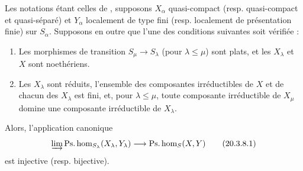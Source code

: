 \begin{proposition}[20.3.8]
\label{IV.20.3.8}
Les notations étant celles de , supposons $X_\alpha$ quasi-compact (resp. quasi-compact et quasi-séparé) et $Y_\alpha$ localement de type fini (resp. localement de présentation finie) sur $S_\alpha$.
Supposons en outre que l'une des conditions suivantes soit vérifiée :
\begin{enumerate}[label=\emph{(\roman*)}]
  \item Les morphismes de transition $S_\mu\to S_\lambda$ (pour $\lambda\leq\mu$) sont plats, et les $X_\lambda$ et $X$ sont noethériens.
  \item Les $X_\lambda$ sont réduits, l'ensemble des composantes irréductibles de $X$ et de chacun des $X_\lambda$ est fini, et, pour $\lambda\leq\mu$, toute composante irréductible de $X_\mu$ domine une composante irréductible de $X_\lambda$.
\end{enumerate}
Alors, l'application canonique
\[
\label{IV.20.3.8.1}
  \varinjlim\operatorname{Ps.hom}_{S_\lambda}(X_\lambda,Y_\lambda)\to\operatorname{Ps.hom}_S(X,Y)
  \tag{20.3.8.1}
\]
est injective (resp. bijective).
\end{proposition}

